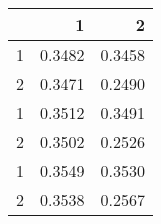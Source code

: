 \begin{tabular}{lrr}
\toprule
{} &       1 &       2 \\
\midrule
1 &  0.3482 &  0.3458 \\
2 &  0.3471 &  0.2490 \\
1 &  0.3512 &  0.3491 \\
2 &  0.3502 &  0.2526 \\
1 &  0.3549 &  0.3530 \\
2 &  0.3538 &  0.2567 \\
\bottomrule
\end{tabular}

